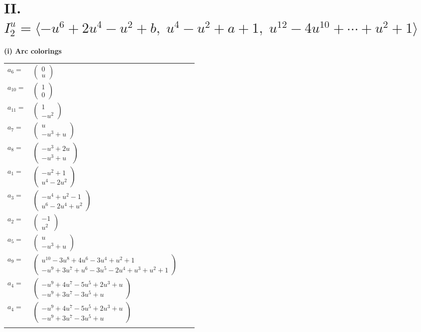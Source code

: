 \documentclass[1p]{elsarticle_modified}
\theoremstyle{definition}
\begin{document}
\centering \section*{II. $I^u_{2}= \langle - u^6+2 u^4- u^2+b,\;u^4- u^2+a+1,\;u^{12}-4 u^{10}+\cdots+u^2+1 \rangle$}
\flushleft \textbf{(i) Arc colorings}\\
\begin{tabular}{m{7pt} m{180pt} m{7pt} m{180pt} }
\flushright $a_{6}=$&$\begin{pmatrix}0\\u\end{pmatrix}$ \\
\flushright $a_{10}=$&$\begin{pmatrix}1\\0\end{pmatrix}$ \\
\flushright $a_{11}=$&$\begin{pmatrix}1\\- u^2\end{pmatrix}$ \\
\flushright $a_{7}=$&$\begin{pmatrix}u\\- u^3+u\end{pmatrix}$ \\
\flushright $a_{8}=$&$\begin{pmatrix}- u^3+2 u\\- u^3+u\end{pmatrix}$ \\
\flushright $a_{1}=$&$\begin{pmatrix}- u^2+1\\u^4-2 u^2\end{pmatrix}$ \\
\flushright $a_{3}=$&$\begin{pmatrix}- u^4+u^2-1\\u^6-2 u^4+u^2\end{pmatrix}$ \\
\flushright $a_{2}=$&$\begin{pmatrix}-1\\u^2\end{pmatrix}$ \\
\flushright $a_{5}=$&$\begin{pmatrix}u\\- u^3+u\end{pmatrix}$ \\
\flushright $a_{9}=$&$\begin{pmatrix}u^{10}-3 u^8+4 u^6-3 u^4+u^2+1\\- u^9+3 u^7+u^6-3 u^5-2 u^4+u^3+u^2+1\end{pmatrix}$ \\
\flushright $a_{4}=$&$\begin{pmatrix}- u^9+4 u^7-5 u^5+2 u^3+u\\- u^9+3 u^7-3 u^5+u\end{pmatrix}$\\ \flushright $a_{4}=$&$\begin{pmatrix}- u^9+4 u^7-5 u^5+2 u^3+u\\- u^9+3 u^7-3 u^5+u\end{pmatrix}$\\&\end{tabular}
\end{document}
